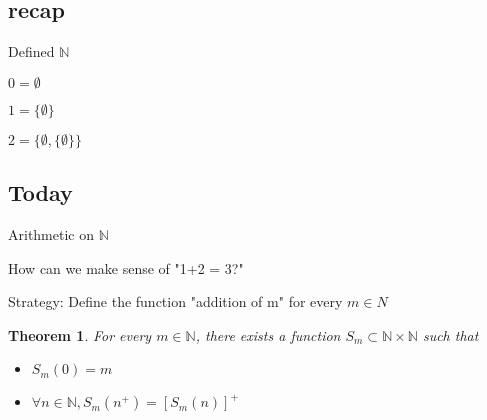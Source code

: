 \documentclass[twoside]{article}
\newcounter{lecnum}
\newcommand{\N}{\mathbb{N}}
\newtheorem{theorem}{Theorem}[lecnum]
\begin{document}
\subsection{recap}

Defined $\N$

$0 = \emptyset$

$1 = \{\emptyset\}$

$2 = \{\emptyset, \{\emptyset\}\}$

\subsection{Today}

Arithmetic on $\N$

How can we make sense of "1+2 = 3?"


Strategy: Define the function "addition of m" for every $m \in N$

\begin{theorem}
    For every $m \in \N$, there exists a function $S_m \subset \N \times \N$ such that 
    \begin{itemize}
        \item     $S_m(0) = m$
        \item $\forall n \in \N, S_m(n^+) = [S_m(n)]^+$
    \end{itemize}
\end{theorem}
\end{document}

